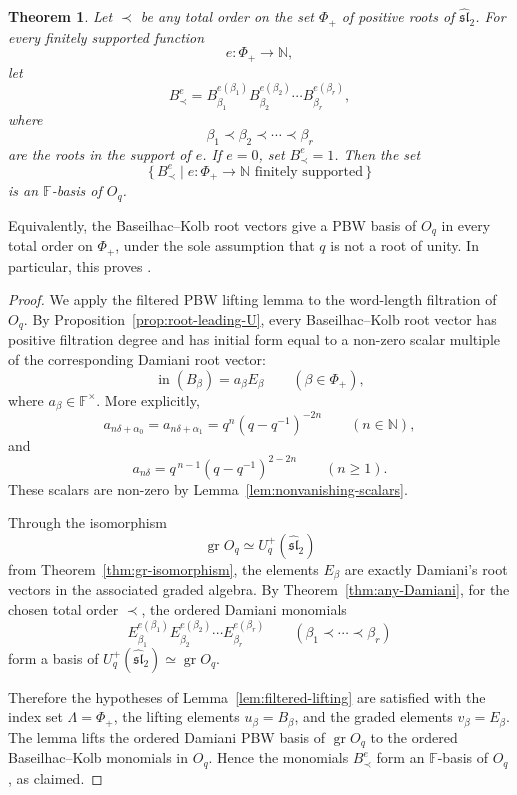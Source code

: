 \documentclass[11pt]{extarticle}
\newtheorem{theorem}{Theorem}[section]
\theoremstyle{definition}
\theoremstyle{remark}
\numberwithin{equation}{section}
\newcommand{\F}{\mathbb F}
\newcommand{\N}{\mathbb N}
\newcommand{\Oq}{O_q}
\newcommand{\Uplus}{U_q^+(\widehat{\mathfrak{sl}}_2)}
\newcommand{\gr}{\operatorname{gr}}
\newcommand{\init}{\operatorname{in}}
\begin{document}
\begin{theorem}
\label{thm:BK-nonroot}
Let \(\prec\) be any total order on the set \(\Phi_+\) of positive roots of
\(\widehat{\mathfrak{sl}}_2\).  For every finitely supported function
\[
        e:\Phi_+\longrightarrow\N ,
\]
let
\[
        B_\prec^e
        =
        B_{\beta_1}^{e(\beta_1)}
        B_{\beta_2}^{e(\beta_2)}
        \cdots
        B_{\beta_r}^{e(\beta_r)},
\]
where
\[
        \beta_1\prec\beta_2\prec\cdots\prec\beta_r
\]
are the roots in the support of \(e\).  If \(e=0\), set
\(B_\prec^e=1\).  Then the set
\[
        \{\,B_\prec^e\mid e:\Phi_+\to\N
        \text{ finitely supported}\,\}
\]
is an \(\F\)-basis of \(\Oq\).
\end{theorem}

Equivalently, the Baseilhac--Kolb root vectors give a PBW basis of
\(\Oq\) in every total order on \(\Phi_+\), under the sole assumption that
\(q\) is not a root of unity.  In particular, this proves
\cite[Conjecture~16.1]{Terwilliger2022OqACE}.

\begin{proof}
We apply the filtered PBW lifting lemma to the word-length filtration of
\(\Oq\).  By Proposition~\ref{prop:root-leading-U}, every
Baseilhac--Kolb root vector has positive filtration degree and has initial
form equal to a non-zero scalar multiple of the corresponding Damiani root
vector:
\[
        \init(B_\beta)=a_\beta E_\beta
        \qquad(\beta\in\Phi_+),
\]
where \(a_\beta\in\F^\times\).  More explicitly,
\[
 a_{n\delta+\alpha_0}
 =
 a_{n\delta+\alpha_1}
 =
 q^n(q-q^{-1})^{-2n}
 \qquad(n\in\N),
\]
and
\[
        a_{n\delta}
        =
        q^{\,n-1}(q-q^{-1})^{2-2n}
        \qquad(n\geq1).
\]
These scalars are non-zero by Lemma~\ref{lem:nonvanishing-scalars}.

Through the isomorphism
\[
        \gr\Oq\simeq\Uplus
\]
from Theorem~\ref{thm:gr-isomorphism}, the elements \(E_\beta\) are exactly
Damiani's root vectors in the associated graded algebra.  By
Theorem~\ref{thm:any-Damiani}, for the chosen total order \(\prec\), the
ordered Damiani monomials
\[
        E_{\beta_1}^{e(\beta_1)}
        E_{\beta_2}^{e(\beta_2)}
        \cdots
        E_{\beta_r}^{e(\beta_r)}
        \qquad
        (\beta_1\prec\cdots\prec\beta_r)
\]
form a basis of \(\Uplus\simeq\gr\Oq\).

Therefore the hypotheses of Lemma~\ref{lem:filtered-lifting} are satisfied
with the index set \(\Lambda=\Phi_+\), the lifting elements \(u_\beta=B_\beta\),
and the graded elements \(v_\beta=E_\beta\).  The lemma lifts the ordered
Damiani PBW basis of \(\gr\Oq\) to the ordered Baseilhac--Kolb monomials in
\(\Oq\).  Hence the monomials \(B_\prec^e\) form an \(\F\)-basis of
\(\Oq\), as claimed.
\end{proof}
\end{document}
